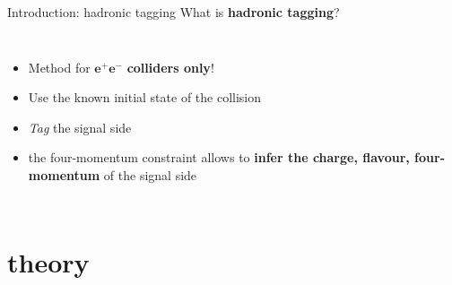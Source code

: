 \documentclass[xcolor=dvipsnames]{beamer}
\begin{document}
\begin{frame}{Introduction: hadronic tagging}
\centering\scriptsize
{\normalsize What is \textbf{hadronic tagging}?}

\vspace{10pt}

\begin{columns}
   

   \begin{itemize}
      \item Method for $\boldsymbol{e^+}\boldsymbol{e^-}$ \textbf{colliders only}!
      \item Use the known initial state of the \epem collision
      \item \textit{Tag} the signal side
      \item[\ra] the four-momentum constraint allows to \textbf{infer the charge, flavour, four-momentum} of the signal side
   \end{itemize}
\end{columns}


\end{frame}


\section{\safeBtoXsgamma theory}
\end{document}

